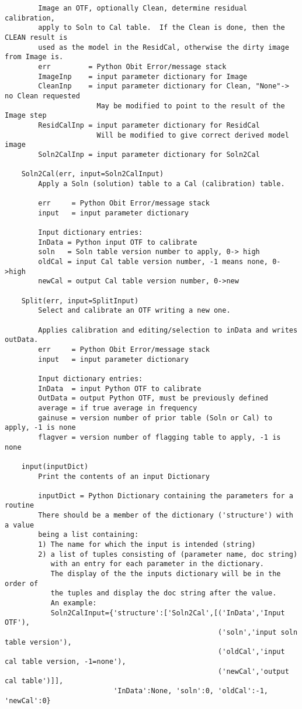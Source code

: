 \documentclass[11pt]{report}
\begin{document}
\begin{verbatim}
        Image an OTF, optionally Clean, determine residual calibration,
        apply to Soln to Cal table.  If the Clean is done, then the CLEAN result is
        used as the model in the ResidCal, otherwise the dirty image from Image is.
        err         = Python Obit Error/message stack
        ImageInp    = input parameter dictionary for Image
        CleanInp    = input parameter dictionary for Clean, "None"-> no Clean requested
                      May be modified to point to the result of the Image step
        ResidCalInp = input parameter dictionary for ResidCal
                      Will be modified to give correct derived model image
        Soln2CalInp = input parameter dictionary for Soln2Cal
    
    Soln2Cal(err, input=Soln2CalInput)
        Apply a Soln (solution) table to a Cal (calibration) table.
        
        err     = Python Obit Error/message stack
        input   = input parameter dictionary
        
        Input dictionary entries:
        InData = Python input OTF to calibrate
        soln   = Soln table version number to apply, 0-> high
        oldCal = input Cal table version number, -1 means none, 0->high
        newCal = output Cal table version number, 0->new
    
    Split(err, input=SplitInput)
        Select and calibrate an OTF writing a new one.
        
        Applies calibration and editing/selection to inData and writes outData.
        err     = Python Obit Error/message stack
        input   = input parameter dictionary
        
        Input dictionary entries:
        InData  = input Python OTF to calibrate
        OutData = output Python OTF, must be previously defined
        average = if true average in frequency
        gainuse = version number of prior table (Soln or Cal) to apply, -1 is none
        flagver = version number of flagging table to apply, -1 is none
    
    input(inputDict)
        Print the contents of an input Dictionary
        
        inputDict = Python Dictionary containing the parameters for a routine
        There should be a member of the dictionary ('structure') with a value
        being a list containing:
        1) The name for which the input is intended (string)
        2) a list of tuples consisting of (parameter name, doc string)
           with an entry for each parameter in the dictionary.
           The display of the the inputs dictionary will be in the order of
           the tuples and display the doc string after the value.
           An example:
           Soln2CalInput={'structure':['Soln2Cal',[('InData','Input OTF'),
                                                   ('soln','input soln table version'),
                                                   ('oldCal','input cal table version, -1=none'),
                                                   ('newCal','output cal table')]],
                          'InData':None, 'soln':0, 'oldCal':-1, 'newCal':0}
    

\end{verbatim}
\end{document}
